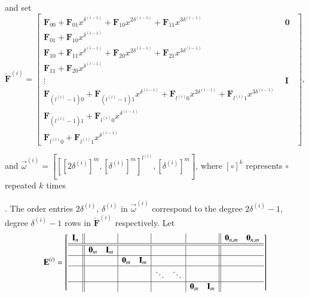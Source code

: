 and set \begin{equation}
\check{\mathbf{F}}^{\left(i\right)}=\left[\begin{array}{l|c}
\mathbf{F}_{00}+\mathbf{F}_{01}x^{\delta^{\left(i-1\right)}}+\mathbf{F}_{10}x^{2\delta^{\left(i-1\right)}}+\mathbf{F}_{11}x^{3\delta^{\left(i-1\right)}} & ~~\mathbf{0}~~\\
\hline \mathbf{F}_{01}+\mathbf{F}_{10}x^{\delta^{\left(i-1\right)}}\\
\mathbf{F}_{10}+\mathbf{F}_{11}x^{\delta^{\left(i-1\right)}}+\mathbf{F}_{20}x^{2\delta^{\left(i-1\right)}}+\mathbf{F}_{21}x^{3\delta^{\left(i-1\right)}}\\
\mathbf{F}_{11}+\mathbf{F}_{20}x^{\delta^{\left(i-1\right)}}\\
\vdots & ~~\mathbf{I}~~\\
\mathbf{F}_{\left(l^{\left(i\right)}-1\right)0}+\mathbf{F}_{\left(l^{\left(i\right)}-1\right)1}x^{\delta^{\left(i-1\right)}}+\mathbf{F}_{l^{\left(i\right)}0}x^{2\delta^{\left(i-1\right)}}+\mathbf{F}_{l^{\left(i\right)}1}x^{3\delta^{\left(i-1\right)}}\\
\mathbf{F}_{\left(l^{\left(i\right)}-1\right)1}+\mathbf{F}_{l^{\left(i\right)}0}x^{\delta^{\left(i-1\right)}}\\
\mathbf{F}_{l^{\left(i\right)}0}+\mathbf{F}_{l^{\left(i\right)}1}x^{\delta^{\left(i-1\right)}}\end{array}\right],\label{eq:extendedStorjohannTransform}\end{equation}
\begin{comment}
This is not ideal, but no better idea. 
\end{comment}
{} and $\vec{\omega}^{\left(i\right)}=\left[\left[[2\delta^{\left(i\right)}]^{m},[\delta^{\left(i\right)}]^{m}\right]^{l^{\left(i\right)}},[\delta^{\left(i\right)}]^{m}\right]$,
where $\left[\circ\right]^{k}$ represents $\circ$ repeated $k$
times%
\begin{comment}
Not sure if using this notation is a good thing to do, but it saves
space and makes presentation easier 
\end{comment}
{}. The order entries $2\delta^{\left(i\right)}$, $\delta^{\left(i\right)}$
in $\vec{\omega}^{\left(i\right)}$ correspond to the degree $2\delta^{\left(i\right)}-1$,
degree $\delta^{\left(i\right)}-1$ rows in $\check{\mathbf{F}}^{\left(i\right)}$
respectively. Let \[
\mathbf{E}^{\left(i\right)}=\left[\begin{array}{c||cc|cc|cc|cc||cc}
\mathbf{I}_{n} &  &  &  &  &  &  &  &  & \mathbf{0}_{n,m} & \mathbf{0}_{n,m}\\
\hline\hline  & \mathbf{0}_{m} & \mathbf{I}_{m} &  &  &  &  &  &  & \ \\
\hline  &  &  & \mathbf{0}_{m} & \mathbf{I}_{m} &  &  &  &  & \ \\
\hline  &  &  &  &  & \ddots & \ddots &  &  & \ \\
\hline  &  &  &  &  &  &  & \mathbf{0}_{m} & \mathbf{I}_{m}\end{array}\right]\]
